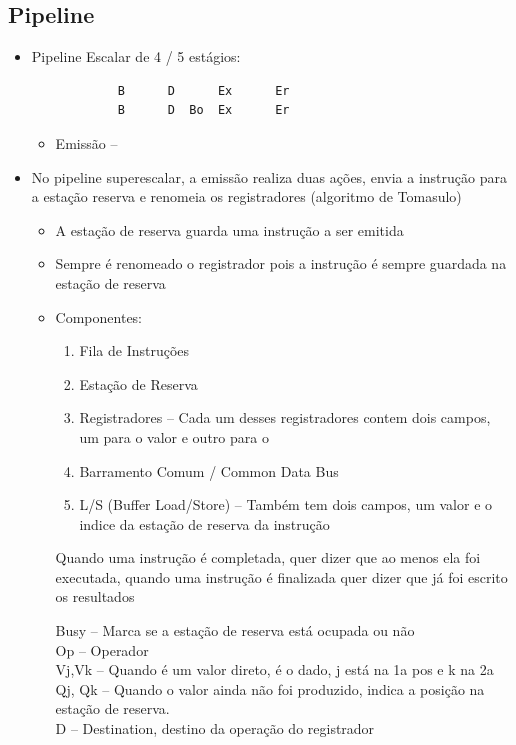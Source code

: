 \documentclass[12pt]{article}
\begin{document}
    \subsection{Pipeline}
    \begin{itemize}
        \item Pipeline Escalar de 4 / 5 estágios:
        \begin{verbatim}
            B      D      Ex      Er
            B      D  Bo  Ex      Er
        \end{verbatim}
        \begin{itemize}
            \item Emissão -- 
        \end{itemize}
        \item No pipeline superescalar, a emissão realiza duas ações, envia a 
        instrução para a estação reserva e renomeia os registradores (algoritmo 
        de Tomasulo)
        \begin{itemize}
            \item A estação de reserva guarda uma instrução a ser emitida
            \item Sempre é renomeado o registrador pois a instrução é sempre 
            guardada na estação de reserva
            \item Componentes:
            \begin{enumerate}
                \item Fila de Instruções
                \item Estação de Reserva
                \item Registradores -- Cada um desses registradores contem dois campos, um para o valor e outro para o 
                \item Barramento Comum / Common Data Bus
                \item L/S (Buffer Load/Store) -- Também tem dois campos, um valor e o indice da estação de reserva da instrução
            \end{enumerate}
            Quando uma instrução é completada, quer dizer que ao menos ela foi 
            executada, quando uma instrução é finalizada quer dizer que já foi 
            escrito os resultados

            Busy -- Marca se a estação de reserva está ocupada ou não \\
            Op -- Operador \\
            Vj,Vk -- Quando é um valor direto, é o dado, j está na 1a pos e k na 
            2a \\
            Qj, Qk -- Quando o valor ainda não foi produzido, indica a posição 
            na estação de reserva. \\
            D -- Destination, destino da operação do registrador


\end{itemize}
\end{itemize}
\end{document}
